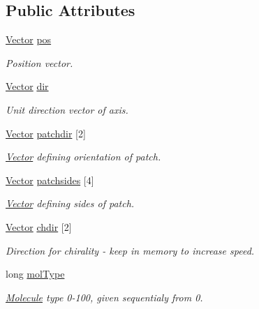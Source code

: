\subsection*{Public Attributes}
\begin{DoxyCompactItemize}
\item 
\hyperlink{class_vector}{Vector} \hyperlink{class_particle_a257abdde975b38a8c6f5be812f18443f}{pos}
\begin{DoxyCompactList}\small\item\em Position vector. \end{DoxyCompactList}\item 
\hyperlink{class_vector}{Vector} \hyperlink{class_particle_a6c8d0f728a634e7ec018fa25e8d59fc6}{dir}
\begin{DoxyCompactList}\small\item\em Unit direction vector of axis. \end{DoxyCompactList}\item 
\hyperlink{class_vector}{Vector} \hyperlink{class_particle_a079cbdc927c2390bfbf1aeed90bb94e6}{patchdir} \mbox{[}2\mbox{]}
\begin{DoxyCompactList}\small\item\em \hyperlink{class_vector}{Vector} defining orientation of patch. \end{DoxyCompactList}\item 
\hyperlink{class_vector}{Vector} \hyperlink{class_particle_a2c60d94c5664a2af5232373f08d74065}{patchsides} \mbox{[}4\mbox{]}
\begin{DoxyCompactList}\small\item\em \hyperlink{class_vector}{Vector} defining sides of patch. \end{DoxyCompactList}\item 
\hyperlink{class_vector}{Vector} \hyperlink{class_particle_adb1225ad15e081be7534279d63bcdf94}{chdir} \mbox{[}2\mbox{]}
\begin{DoxyCompactList}\small\item\em Direction for chirality -\/ keep in memory to increase speed. \end{DoxyCompactList}\item 
long \hyperlink{class_particle_a6a469f985209c064c1e180b019f741be}{mol\+Type}
\begin{DoxyCompactList}\small\item\em \hyperlink{class_molecule}{Molecule} type 0-\/100, given sequentialy from 0. \end{DoxyCompactList}\item 

\end{DoxyCompactItemize}
